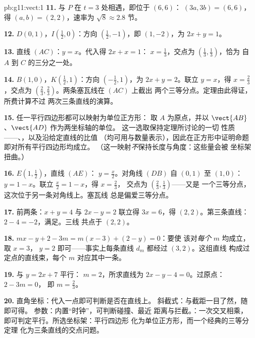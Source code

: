 \begin{solution}{pb:g11:vect:1}
\textbf{11.} 与 $P$ 在 $t = 3$ 处相遇，即位于 $(6, 6)$：
$(3a, 3b) = (6, 6)$，得 $(a, b) = (2, 2)$，速率为
$\sqrt{8} \approx 2.8$ 节。

\textbf{12.} $D(0, 1)$，$I\left(\frac12, 0\right)$：方向
$\left(\frac12, -1\right)$，即 $(1, -2)$，为
$2x + y = 1$。

\textbf{13.} 直线 $(AC)$：$y = x$。代入得 $2x + x = 1$：
$x = \frac13$，交点为 $\left(\frac13, \frac13\right)$，恰为
自 $A$ 到 $C$ 的三分之一处。

\textbf{14.} $B(1, 0)$，$K\left(\frac12, 1\right)$：方向
$\left(-\frac12, 1\right)$，为 $2x + y = 2$。联立
$y = x$，得 $x = \frac23$，交点为
$\left(\frac23, \frac23\right)$。两条塞瓦线在 $(AC)$ 上截出
两个三等分点。定理由此得证，所费计算不过
两次三条直线的演算。

\textbf{15.} 任一平行四边形都可以映射为单位正方形：
取 $A$ 为原点，并以 $\vect{AB}$、$\vect{AD}$ 作为两坐标轴的单位。
这一选取保持定理所讨论的一切
性质——、，以及沿给定直线的比值
（均可用与数量表示），因此在正方形中证明命题
即对所有平行四边形均成立。
（这一映射\emph{不}保持长度与角度：这些量会被
坐标架扭曲。）

\textbf{16.} $E\left(1, \frac12\right)$，直线 $(AE)$：
$y = \frac x2$。对角线 $(DB)$ 自 $(0,1)$ 至 $(1,0)$：
$y = 1 - x$。联立 $\frac x2 = 1 - x$，得 $x = \frac23$，
交点为 $\left(\frac23, \frac13\right)$——又是
一个三等分点，这次位于另一条对角线上。塞瓦线
总是偏爱三等分点。

\textbf{17.} 前两条：$x + y = 4$ 与 $2x - y = 2$ 联立得
$3x = 6$，得 $(2, 2)$。第三条直线：$2 - 4 = -2$，满足。三线
共点于 $(2, 2)$。

\textbf{18.} $mx - y + 2 - 3m = m(x - 3) + (2 - y) = 0$：要使
该对\emph{每个} $m$ 均成立，取 $x = 3$，
$y = 2$ 即可——事实上每条直线 $d_m$ 都经过 $(3, 2)$。这组直线
构成过定点的直线束，每个 $m$ 对应其中一条。

\textbf{19.} 与 $y = 2x + 7$ 平行： $m = 2$，所求直线为
$2x - y - 4 = 0$。过原点：$2 - 3m = 0$，
即 $m = \frac23$。

\textbf{20.} 直角坐标：代入一点即可判断是否在直线上。
斜截式：与截距一目了然，随即可得。
参数：内置“时钟”，可判断碰撞、最近
距离与拦截。：一次交叉相乘，
即可判定平行。所选坐标架：平行四边形
化为单位正方形，而一个经典的三等分定理
化为三条直线的交点问题。
\end{solution}
